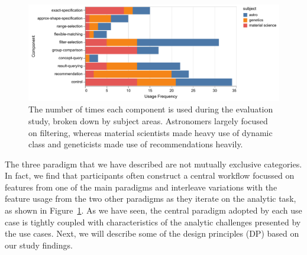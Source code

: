 \begin{figure}[h!]
  \includegraphics[width=\linewidth]{figures/usagefreqbysubject.pdf}
  \caption{The number of times each component is used during the evaluation study, broken down by subject areas. Astronomers largely focused on filtering, whereas material scientists made heavy use of dynamic class and geneticists made use of recommendations heavily.}\label{fig:usagefreqbysubject}
\end{figure}
\par The three paradigm that we have described are not mutually exclusive categories. In fact, we find that participants often construct a central workflow focussed on features from one of the main paradigms and interleave variations with the feature usage from the two other paradigms as they iterate on the analytic task, as shown in Figure~\ref{fig:usagefreqbysubject}. As we have seen, the central paradigm adopted by each use case is tightly coupled with characteristics of the analytic challenges presented by the use cases. Next, we will describe some of the design principles (DP) based on our study findings.

